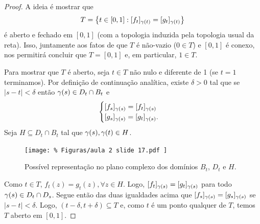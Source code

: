     \begin{proof}
        A ideia é mostrar que
        \begin{equation*}
            T = \left\{ t\in [0,1] : [f_t]_{\gamma(t)}= [g_t]_{\gamma(t)} \right\}
        \end{equation*}
        é aberto e fechado em $[0,1]$ (com a topologia induzida pela topologia usual da reta).
        Isso, juntamente aos fatos de que $T$ é não-vazio ($0\in T$) e $[0,1]$ é conexo, 
        nos permitirá concluir que $T = [0,1]$ e, em particular, $1\in T$.
        
        Para mostrar que $T$ é aberto, seja $t\in T$ não nulo e diferente de 1 
        (se $t=1$ terminamos). Por definição de continuação analítica, existe $\delta > 0$
        tal que se $|s-t|<\delta$ então $\gamma(s) \in D_t\cap B_t$ e
        \begin{equation*}
            \begin{cases}
            [f_s]_{\gamma(s)} = [f_t]_{\gamma(s)} \\
            [g_s]_{\gamma(s)} = [g_t]_{\gamma(s)}.
            \end{cases}
        \end{equation*}
        Seja $H\subseteq D_t\cap B_t$ tal que $\gamma(s), \gamma(t)\in H$. 
        \begin{figure}[H]\centering
            \texttt{[image: \%
                Figuras/aula 2 slide 17.pdf
            ]}
            \caption{%
                Possível representação no plano complexo dos domínios $B_t$, $D_t$ e $H$.
            }
        \end{figure}
        Como $t\in T$,
        $f_t(z) = g_t(z), \forall z\in H$. Logo, $[f_t]_{\gamma(s)} = [g_t]_{\gamma(s)}$
        para todo $\gamma(s)\in D_t\cap D_s$. Segue então das duas igualdades acima que
        $[f_s]_{\gamma(s)} = [g_s]_{\gamma(s)}$ se $|s-t|<\delta$. Logo, 
        $(t-\delta, t+\delta)\subseteq T$ e, como $t$ é um ponto qualquer de $T$, temos
        $T$ aberto em $[0,1]$.
        

\end{proof}
